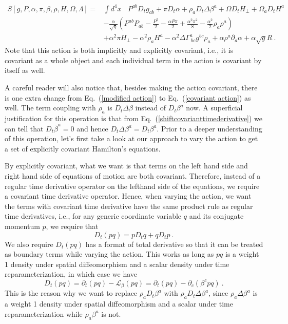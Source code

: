 \begin{equation}\label{covariant action}
\begin{split}
S[g, P, \alpha, \pi, \beta, \rho, H, \Omega, \Lambda ] = & \int d^{4}x ~~~~P^{ab}D_{t}g_{ab} + \pi D_{t}\alpha + \rho_{a}D_{t}\Delta \beta^{a} + \Omega D_{t}H_{\perp} + \Omega_{a}D_{t}H^{a}\\
& - \frac{\alpha}{\sqrt{g}}\left(P^{ab}P_{ab} - \frac{P^{2}}{2} - \frac{\alpha P \pi}{2} + \frac{\alpha^{2}\pi^{2}}{8} - \frac{\alpha^{2}}{2}\rho_{a}\rho^{a}\right)\\
& +\alpha^{2}\pi H_{\perp} - \alpha^{2}\rho_{a}H^{a} - \alpha^{2}\Delta\Gamma^{a}_{~bc}g^{bc}\rho_{a} + \alpha \rho^{a}\partial_{a}\alpha + \alpha\sqrt{g}R \ .
\end{split}
\end{equation}
Note that this action is both implicitly and explicitly covariant, i.e., it is covariant as a whole object and each individual term in the action is covariant by itself as well. 

A careful reader will also notice that, besides making the action covariant, there is one extra change from Eq.~(\ref{modified action}) to Eq.~(\ref{covariant action}) as well. The term coupling with $\rho_{a}$ is $D_{t}\Delta \beta$ instead of $D_{t}\beta^{a}$ now. A superficial justification for this operation is that from Eq.~(\ref{shiftcovarianttimederivative}) we can tell that $D_{t}{\bar \beta}^{a} = 0$ and hence $D_{t}\Delta \beta^{a} = D_{t}\beta^{a}$. Prior to a deeper understanding of this operation, let's first take a look at our approach to vary the action to get a set of explicitly covariant Hamilton's equations. 

By explicitly covariant, what we want is that terms on the left hand side and right hand side of equations of motion are both covariant. Therefore, instead of a regular time derivative operator on the lefthand side of the equations, we require a covariant time derivative operator. Hence, when varying the action, we want the terms with covariant time derivative have the same product rule as regular time derivatives, i.e., for any generic coordinate variable $q$ and its conjugate momentum $p$, we require that
\begin{equation}\label{productrule}
D_{t}( pq ) = pD_{t}q + qD_{t}p \ .
\end{equation}
We also require $D_{t}(pq)$ has a format of total derivative so that it can be treated as boundary terms while varying the action. This works as long as $pq$ is a weight 1 density under spatial diffeomorphism and a scalar density under time reparameterization, in which case we have
\begin{equation}
D_{t}(pq) = \partial_{t}(pq) - \mathcal{L}_{\beta}(pq) = \partial_{t}(pq) - \partial_{c}\left(\beta^{c}pq\right) \ .
\end{equation}
This is the reason why we want to replace $\rho_{a}D_{t}\beta^{a}$ with $\rho_{a}D_{t}\Delta \beta^{a}$, since $\rho_{a}\Delta \beta^{a}$ is a weight 1 density under spatial diffeomorphism and a scalar under time reparameterization while $\rho_{a}\beta^{a}$ is not. 

